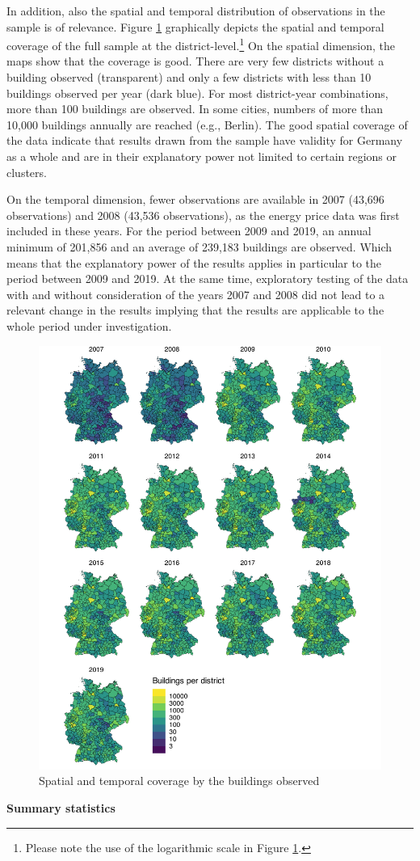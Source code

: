 \documentclass[12pt,twoside]{reedthesis}
\begin{document}
In addition, also the spatial and temporal distribution of observations in the sample is of relevance. Figure \ref{fig:buildings-distribution} graphically depicts the spatial and temporal coverage of the full sample at the district-level.\footnote{Please note the use of the logarithmic scale in Figure \ref{fig:buildings-distribution}.} On the spatial dimension, the maps show that the coverage is good. There are very few districts without a building observed (transparent) and only a few districts with less than 10 buildings observed per year (dark blue). For most district-year combinations, more than 100 buildings are observed. In some cities, numbers of more than 10,000 buildings annually are reached (e.g., Berlin). The good spatial coverage of the data indicate that results drawn from the sample have validity for Germany as a whole and are in their explanatory power not limited to certain regions or clusters.

On the temporal dimension, fewer observations are available in 2007 (43,696 observations) and 2008 (43,536 observations), as the energy price data was first included in these years. For the period between 2009 and 2019, an annual minimum of 201,856 and an average of 239,183 buildings are observed. Which means that the explanatory power of the results applies in particular to the period between 2009 and 2019. At the same time, exploratory testing of the data with and without consideration of the years 2007 and 2008 did not lead to a relevant change in the results implying that the results are applicable to the whole period under investigation.
\begin{figure}

{\centering \includegraphics[width=0.77\linewidth]{figure/buildings_distribution} 

}

\caption{Spatial and temporal coverage by the buildings observed}\label{fig:buildings-distribution}
\end{figure}
\textbf{Summary statistics}
\end{document}
